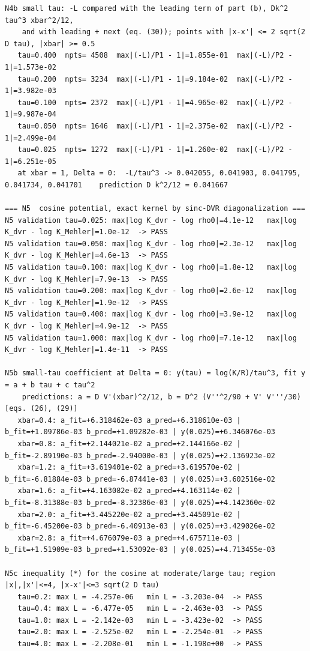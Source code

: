 \documentclass[11pt,a4paper]{article}
\begin{document}
\begin{lstlisting}
N4b small tau: -L compared with the leading term of part (b), Dk^2 tau^3 xbar^2/12,
    and with leading + next (eq. (30)); points with |x-x'| <= 2 sqrt(2 D tau), |xbar| >= 0.5
   tau=0.400  npts= 4508  max|(-L)/P1 - 1|=1.855e-01  max|(-L)/P2 - 1|=1.573e-02
   tau=0.200  npts= 3234  max|(-L)/P1 - 1|=9.184e-02  max|(-L)/P2 - 1|=3.982e-03
   tau=0.100  npts= 2372  max|(-L)/P1 - 1|=4.965e-02  max|(-L)/P2 - 1|=9.987e-04
   tau=0.050  npts= 1646  max|(-L)/P1 - 1|=2.375e-02  max|(-L)/P2 - 1|=2.499e-04
   tau=0.025  npts= 1272  max|(-L)/P1 - 1|=1.260e-02  max|(-L)/P2 - 1|=6.251e-05
   at xbar = 1, Delta = 0:  -L/tau^3 -> 0.042055, 0.041903, 0.041795, 0.041734, 0.041701    prediction D k^2/12 = 0.041667

=== N5  cosine potential, exact kernel by sinc-DVR diagonalization ===
N5 validation tau=0.025: max|log K_dvr - log rho0|=4.1e-12   max|log K_dvr - log K_Mehler|=1.0e-12  -> PASS
N5 validation tau=0.050: max|log K_dvr - log rho0|=2.3e-12   max|log K_dvr - log K_Mehler|=4.6e-13  -> PASS
N5 validation tau=0.100: max|log K_dvr - log rho0|=1.8e-12   max|log K_dvr - log K_Mehler|=7.9e-13  -> PASS
N5 validation tau=0.200: max|log K_dvr - log rho0|=2.6e-12   max|log K_dvr - log K_Mehler|=1.9e-12  -> PASS
N5 validation tau=0.400: max|log K_dvr - log rho0|=3.9e-12   max|log K_dvr - log K_Mehler|=4.9e-12  -> PASS
N5 validation tau=1.000: max|log K_dvr - log rho0|=7.1e-12   max|log K_dvr - log K_Mehler|=1.4e-11  -> PASS

N5b small-tau coefficient at Delta = 0: y(tau) = log(K/R)/tau^3, fit y = a + b tau + c tau^2
    predictions: a = D V'(xbar)^2/12, b = D^2 (V''^2/90 + V' V'''/30)   [eqs. (26), (29)]
   xbar=0.4: a_fit=+6.318462e-03 a_pred=+6.318610e-03 | b_fit=+1.09786e-03 b_pred=+1.09282e-03 | y(0.025)=+6.346076e-03
   xbar=0.8: a_fit=+2.144021e-02 a_pred=+2.144166e-02 | b_fit=-2.89190e-03 b_pred=-2.94000e-03 | y(0.025)=+2.136923e-02
   xbar=1.2: a_fit=+3.619401e-02 a_pred=+3.619570e-02 | b_fit=-6.81884e-03 b_pred=-6.87441e-03 | y(0.025)=+3.602516e-02
   xbar=1.6: a_fit=+4.163082e-02 a_pred=+4.163114e-02 | b_fit=-8.31388e-03 b_pred=-8.32386e-03 | y(0.025)=+4.142360e-02
   xbar=2.0: a_fit=+3.445220e-02 a_pred=+3.445091e-02 | b_fit=-6.45200e-03 b_pred=-6.40913e-03 | y(0.025)=+3.429026e-02
   xbar=2.8: a_fit=+4.676079e-03 a_pred=+4.675711e-03 | b_fit=+1.51909e-03 b_pred=+1.53092e-03 | y(0.025)=+4.713455e-03

N5c inequality (*) for the cosine at moderate/large tau; region |x|,|x'|<=4, |x-x'|<=3 sqrt(2 D tau)
   tau=0.2: max L = -4.257e-06   min L = -3.203e-04  -> PASS
   tau=0.4: max L = -6.477e-05   min L = -2.463e-03  -> PASS
   tau=1.0: max L = -2.142e-03   min L = -3.423e-02  -> PASS
   tau=2.0: max L = -2.525e-02   min L = -2.254e-01  -> PASS
   tau=4.0: max L = -2.208e-01   min L = -1.198e+00  -> PASS


\end{lstlisting}
\end{document}
